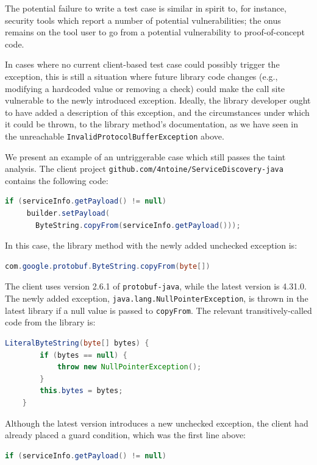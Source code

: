 The potential failure to write a test case is similar in spirit to, for instance, security tools which report a number of potential vulnerabilities; the onus remains on the tool user to go from a potential vulnerability to proof-of-concept code.

In cases where no current client-based test case could possibly trigger the exception, this is still a situation where future library code changes (e.g., modifying a hardcoded value or removing a check) could make the call site vulnerable to the newly introduced exception. Ideally, the library developer ought to have added a description of this exception, and the circumstances under which it could be thrown, to the library method's documentation, as we have seen in the unreachable \texttt{InvalidProtocolBufferException} above.

We present an example of an untriggerable case which still passes the taint analysis. The client project \texttt{github.com/4ntoine/ServiceDiscovery-java} contains the following code:

\begin{lstlisting}[language=Java]
    if (serviceInfo.getPayload() != null)
     builder.setPayload(
       ByteString.copyFrom(serviceInfo.getPayload()));
\end{lstlisting}

In this case, the library method with the newly added unchecked exception is:

\begin{lstlisting}[language=Java]
    com.google.protobuf.ByteString.copyFrom(byte[])
\end{lstlisting}

The client uses version 2.6.1 of \texttt{protobuf-java}, while the latest version is 4.31.0. The newly added exception, \texttt{java.lang.NullPointerException}, is thrown in the latest library if a null value is passed to \texttt{copyFrom}. The relevant transitively-called code from the library is:

\begin{lstlisting}[language=Java]
    LiteralByteString(byte[] bytes) {
        if (bytes == null) {
            throw new NullPointerException();
        }
        this.bytes = bytes;
    }
\end{lstlisting}

Although the latest version introduces a new unchecked exception, the client had already placed a guard condition, which was the first line above:

\begin{lstlisting}[language=Java]
  if (serviceInfo.getPayload() != null)
\end{lstlisting}

